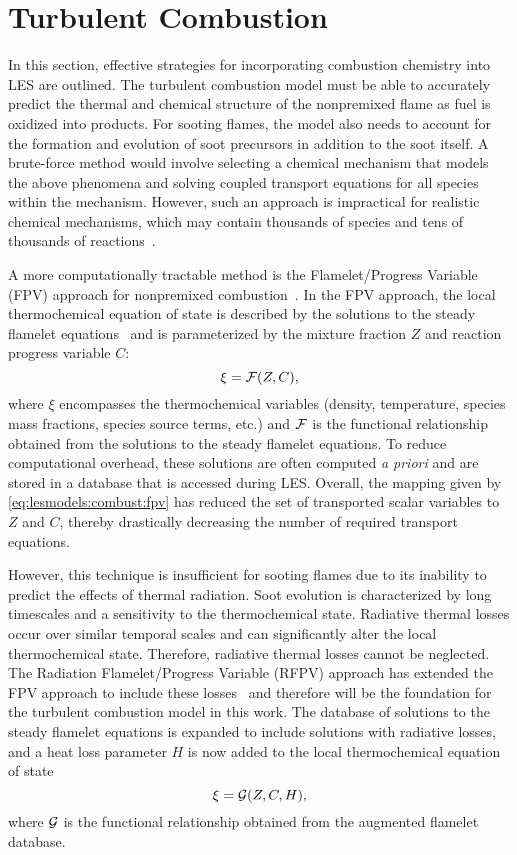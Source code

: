 \section{Turbulent Combustion}
\label{sec:lesmodels:combust}

In this section, effective strategies for incorporating combustion chemistry into LES are outlined. The turbulent combustion model must be able to accurately predict the thermal and chemical structure of the nonpremixed flame as fuel is oxidized into products. For sooting flames, the model also needs to account for the formation and evolution of soot precursors in addition to the soot itself. A brute-force method would involve selecting a chemical mechanism that models the above phenomena and solving coupled transport equations for all species within the mechanism. However, such an approach is impractical for realistic chemical mechanisms, which may contain thousands of species and tens of thousands of reactions~\cite{law2007}.

A more computationally tractable method is the Flamelet/Progress Variable (FPV) approach for nonpremixed combustion~\cite{pierce2004}. In the FPV approach, the local thermochemical equation of state is described by the solutions to the steady flamelet equations~\cite{peters1984} and is parameterized by the mixture fraction $Z$ and reaction progress variable $C$:
\begin{equation}\label{eq:lesmodels:combust:fpv}
  \xi = \mathcal{F}(Z,C),
\end{equation}
where $\xi$ encompasses the thermochemical variables (density, temperature, species mass fractions, species source terms, etc.) and $\mathcal{F}$ is the functional relationship obtained from the solutions to the steady flamelet equations. To reduce computational overhead, these solutions are often computed \textit{a priori} and are stored in a database that is accessed during LES. Overall, the mapping given by \cref{eq:lesmodels:combust:fpv} has reduced the set of transported scalar variables to $Z$ and $C$, thereby drastically decreasing the number of required transport equations.

However, this technique is insufficient for sooting flames due to its inability to predict the effects of thermal radiation. Soot evolution is characterized by long timescales and a sensitivity to the thermochemical state. Radiative thermal losses occur over similar temporal scales and can significantly alter the local thermochemical state. Therefore, radiative thermal losses cannot be neglected. The Radiation Flamelet/Progress Variable (RFPV) approach has extended the FPV approach to include these losses~\cite{ihme2008} and therefore will be the foundation for the turbulent combustion model in this work. The database of solutions to the steady flamelet equations is expanded to include solutions with radiative losses, and a heat loss parameter $H$ is now added to the local thermochemical equation of state
\begin{equation}\label{eq:lesmodels:combust:rfpv}
  \xi = \mathcal{G}(Z, C, H),
\end{equation}
where $\mathcal{G}$ is the functional relationship obtained from the augmented flamelet database.

